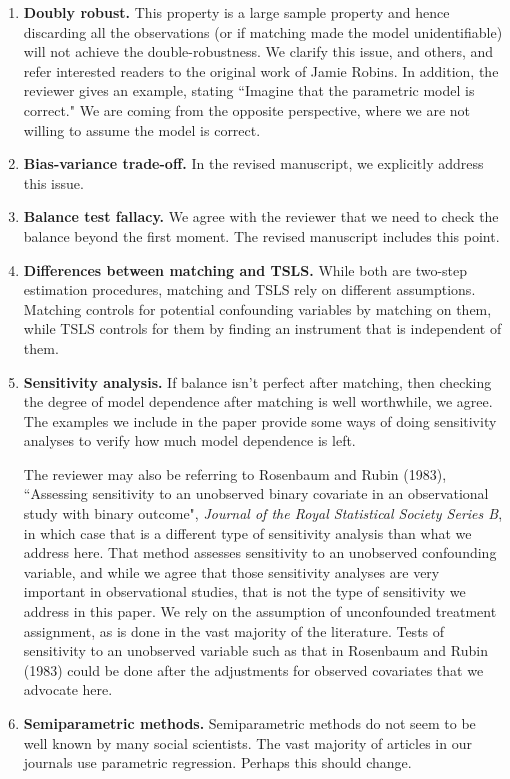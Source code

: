 \documentclass[11pt]{article}
\begin{document}
\begin{enumerate}
\item {\bf Doubly robust.} This property is a large sample property
  and hence discarding all the observations (or if matching made the
  model unidentifiable) will not achieve the double-robustness.  We
  clarify this issue, and others, and refer interested readers to the
  original work of Jamie Robins.  In addition, the reviewer gives an example,
  stating ``Imagine that the parametric model is correct."  We are coming
  from the opposite perspective, where we are not willing to assume the model
  is correct.  
 
\item {\bf Bias-variance trade-off.} In the revised manuscript, we
  explicitly address this issue.

\item {\bf Balance test fallacy.} We agree with the reviewer that we
  need to check the balance beyond the first moment.  The revised
  manuscript includes this point.


\item {\bf Differences between matching and TSLS.} While both are
  two-step estimation procedures, matching and TSLS rely on different
  assumptions. Matching controls for potential confounding variables
  by matching on them, while TSLS controls for them by finding an
  instrument that is independent of them.
  
\item {\bf Sensitivity analysis.} If balance isn't perfect after
  matching, then checking the degree of model dependence after
  matching is well worthwhile, we agree.  The examples we include in
  the paper provide some ways of doing sensitivity analyses to verify
  how much model dependence is left.

  The reviewer may also be referring to Rosenbaum and Rubin
   (1983), ``Assessing sensitivity to an unobserved binary covariate in an observational study with
  binary outcome", {\it Journal of the Royal Statistical Society Series B}, 
  in which case that is a different type of sensitivity analysis than what we address here.  That method 
  assesses sensitivity to an unobserved confounding variable, and while we agree that those 
  sensitivity analyses are very important in observational studies, that is not the type of sensitivity 
  we address in this paper.  We rely on the assumption of unconfounded treatment assignment, as is 
  done in 
  the vast majority of the literature.  Tests of sensitivity to an unobserved variable such as that in 
  Rosenbaum and 
  Rubin (1983) could be done after the adjustments for observed covariates that we advocate here.

\item {\bf Semiparametric methods.} Semiparametric methods do not seem
  to be well known by many social scientists.  The vast majority of
  articles in our journals use parametric regression.  Perhaps this
  should change.

\end{enumerate}
\end{document}
